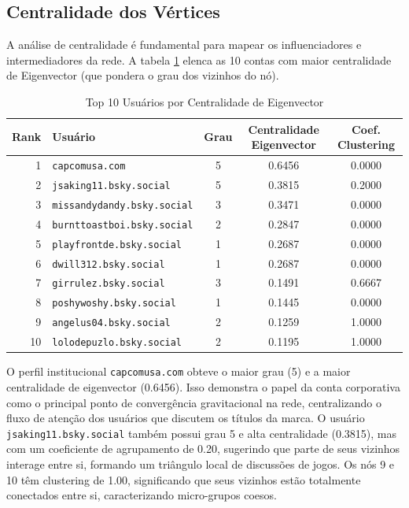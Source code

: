 \documentclass[12pt,a4paper]{article}
\begin{document}
\subsection{Centralidade dos Vértices}
A análise de centralidade é fundamental para mapear os influenciadores e intermediadores da rede. A tabela \ref{tab:centralities} elenca as 10 contas com maior centralidade de Eigenvector (que pondera o grau dos vizinhos do nó).

\begin{table}[H]
\centering
\caption{Top 10 Usuários por Centralidade de Eigenvector}
\label{tab:centralities}
\begin{tabular}{rlccc}
\toprule
\textbf{Rank} & \textbf{Usuário} & \textbf{Grau} & \textbf{Centralidade Eigenvector} & \textbf{Coef. Clustering} \\
\midrule
1 & \texttt{capcomusa.com} & 5 & 0.6456 & 0.0000 \\
2 & \texttt{jsaking11.bsky.social} & 5 & 0.3815 & 0.2000 \\
3 & \texttt{missandydandy.bsky.social} & 3 & 0.3471 & 0.0000 \\
4 & \texttt{burnttoastboi.bsky.social} & 2 & 0.2847 & 0.0000 \\
5 & \texttt{playfrontde.bsky.social} & 1 & 0.2687 & 0.0000 \\
6 & \texttt{dwill312.bsky.social} & 1 & 0.2687 & 0.0000 \\
7 & \texttt{girrulez.bsky.social} & 3 & 0.1491 & 0.6667 \\
8 & \texttt{poshywoshy.bsky.social} & 1 & 0.1445 & 0.0000 \\
9 & \texttt{angelus04.bsky.social} & 2 & 0.1259 & 1.0000 \\
10 & \texttt{lolodepuzlo.bsky.social} & 2 & 0.1195 & 1.0000 \\
\bottomrule
\end{tabular}
\end{table}

O perfil institucional \texttt{capcomusa.com} obteve o maior grau (5) e a maior centralidade de eigenvector (0.6456). Isso demonstra o papel da conta corporativa como o principal ponto de convergência gravitacional na rede, centralizando o fluxo de atenção dos usuários que discutem os títulos da marca. O usuário \texttt{jsaking11.bsky.social} também possui grau 5 e alta centralidade (0.3815), mas com um coeficiente de agrupamento de 0.20, sugerindo que parte de seus vizinhos interage entre si, formando um triângulo local de discussões de jogos. Os nós 9 e 10 têm clustering de 1.00, significando que seus vizinhos estão totalmente conectados entre si, caracterizando micro-grupos coesos.
\end{document}

